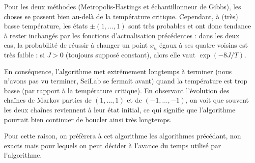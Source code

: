 \documentclass[a4paper,11pt]{article}
\begin{document}
Pour les deux méthodes (Metropolis-Hastings et échantillonneur de Gibbs), les choses se passent bien au-delà de la température critique. Cependant, à (très) basse température, les états $\pm(1,\hdots,1)$ sont très probables et ont donc tendance à rester inchangés par les fonctions d'actualisation précédentes : dans les deux cas, la probabilité de réussir à changer un point $x_u$ égaux à ses quatre voisins est très faible : si $J>0$ (toujours supposé constant), alors elle vaut $\exp(-8 J/T)$.

En conséquence, l'algorithme met extrêmement longtemps à terminer (nous n'avons pas vu terminer, SciLab se fermait avant) quand la température est trop basse (par rapport à la température critique). En observant l'évolution des chaînes de Markov parties de $(1,\hdots,1)$ et de $(-1,\hdots,-1)$, on voit que souvent les deux chaînes reviennent à leur état initial, ce qui signifie que l'algorithme pourrait bien continuer de boucler ainsi très longtemps.

Pour cette raison, on préfèrera à cet algorithme les algorithmes précédant, non exacts mais pour lequels on peut décider à l'avance du temps utilisé par l'algorithme.
\end{document}
